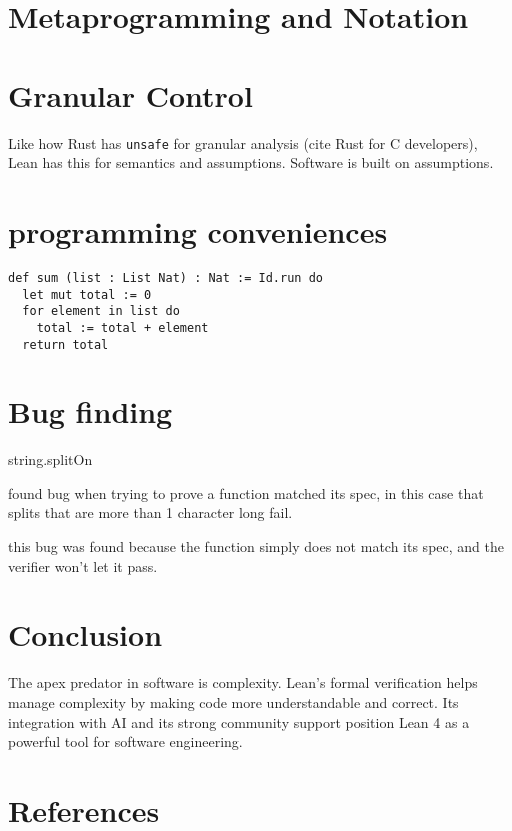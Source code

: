 \documentclass{article}
\begin{document}
\section{Metaprogramming and Notation}

\section{Granular Control}
Like how Rust has \texttt{unsafe} for granular analysis (cite Rust for C developers),
Lean has this for semantics and assumptions. Software is built on assumptions.

\section{programming conveniences}

\begin{verbatim}
def sum (list : List Nat) : Nat := Id.run do
  let mut total := 0
  for element in list do
    total := total + element
  return total
\end{verbatim}

\section{Bug finding}

string.splitOn

found bug when trying to prove a function matched its spec, in this case that splits that are more than 1 character long fail.

this bug was found because the function simply does not match its spec, and the verifier won't let it pass.

\section{Conclusion}

The apex predator in software is complexity. Lean's formal verification helps manage complexity by making code more understandable and correct. Its integration with AI and its strong community support position Lean 4 as a powerful tool for software engineering.

\section*{References}
\end{document}

